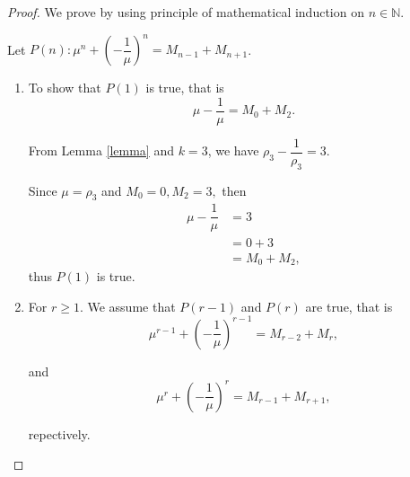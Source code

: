 \documentclass{rmutt-seminar}
\begin{document}
\begin{proof}
We prove by using principle of mathematical induction on $n \in \mathbb{N}.$

\quad Let $P(n):\mu^n + \left(-\dfrac{1}{\mu}\right)^n = M_{n-1} + M_{n+1}$. 
\begin{enumerate}[label=(\roman*),leftmargin = 1.5cm]
	\item To show  that $P(1)$ is true, that is 
	$$\mu - \dfrac{1}{\mu} = M_{0} + M_{2}.$$ 

 From Lemma \ref{lemma} and $k=3$, we have $\rho_3 - \dfrac{1}{\rho_3} =3 .$
 
 Since $ \mu = \rho_3$ and $M_0=0, M_2=3,$ then 
  \begin{align*}
 	\mu - \dfrac{1}{\mu} &= 3\\
 	&= 0 + 3\\
 	&= M_{0} + M_{2},
 \end{align*}
 thus  $P(1)$  is true.
 
 \item For $r \geq 1$. We assume that $P(r-1)$ and $P(r)$ are true, that is
 \begin{equation*}
	\mu^{r-1} + \left(-\dfrac{1}{\mu}\right)^{r-1} = M_{r-2} + M_{r} ,
\end{equation*}

and
\begin{equation*}
	\mu^{r} + \left(-\dfrac{1}{\mu}\right)^{r} = M_{r-1} + M_{r+1},
\end{equation*}

repectively.


\end{enumerate}
\end{proof}
\end{document}

